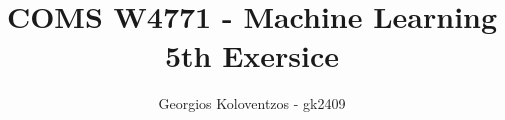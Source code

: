 \documentclass[letterpaper,single,9pt]{article}
\begin{document}
\title{COMS W4771 - Machine Learning 5th Exersice}

  \author{ {\rm Georgios Koloventzos - gk2409} \\ }

\maketitle






\end{document}

